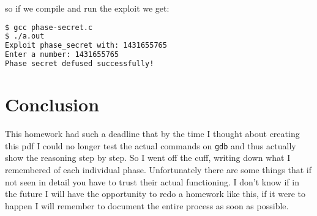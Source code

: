 \documentclass[a4paper,12pt]{report}  %
\newcommand{\lstinlinebg}[1]{\colorbox{backcolour}{\lstinline|#1|}}
\begin{document}
so if we compile and run the exploit we get:
\begin{lstlisting}[language=bash,numbers=none]
$ gcc phase-secret.c 
$ ./a.out 
Exploit phase_secret with: 1431655765
Enter a number: 1431655765                               
Phase secret defused successfully!
\end{lstlisting}

\section{Conclusion}
This homework had such a deadline that by the time I thought about creating this pdf I could no longer test the actual commands on \lstinlinebg{gdb} and thus actually show the reasoning step by step.
So I went off the cuff, writing down what I remembered of each individual phase.
Unfortunately there are some things that if not seen in detail you have to trust their actual functioning.
I don't know if in the future I will have the opportunity to redo a homework like this, if it were to happen I will remember to document the entire process as soon as possible.
\end{document}
